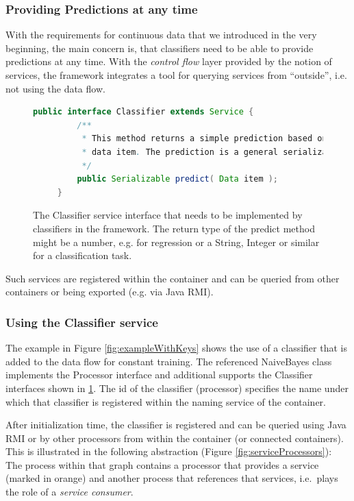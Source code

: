 \subsubsection*{Providing Predictions at any time}
With the requirements for continuous data that we introduced in the
very beginning, the main concern is, that classifiers need to be able
to provide predictions at any time. With the {\em control flow} layer
provided by the notion of services, the \streams framework integrates
a tool for querying services from ``outside'', i.e. not using the data
flow.
\begin{figure}[b]
  \centering
  \begin{lstlisting}[language=Java]
     public interface Classifier extends Service {
         /**
          * This method returns a simple prediction based on the given
          * data item. The prediction is a general serializable value.
          */
         public Serializable predict( Data item );
     }
  \end{lstlisting}
  \caption{\label{fig:classifierService}The {\ttfamily Classifier}
    service interface that needs to be implemented by classifiers in
    the \streams framework. The return type of the {\ttfamily predict}
    method might be a number, e.g. for regression or a String, Integer
    or similar for a classification task.}
\end{figure}
Such services are registered within the container and can be
queried from other containers or being exported (e.g. via Java RMI).


\subsubsection{\label{sec:addPrediction}Using the Classifier service}
The example in Figure \ref{fig:exampleWithKeys} shows the use of a
classifier that is added to the data flow for constant training. The
referenced {\ttfamily NaiveBayes} class implements the {\ttfamily
  Processor} interface and additional supports the {\ttfamily
  Classifier} interfaces shown in \ref{fig:classifierService}. The
{\ttfamily id} of the classifier (processor) specifies the name under
which that classifier is registered within the naming service of the
container.

After initialization time, the classifier is registered and can be
queried using Java RMI or by other processors from within the
container (or connected containers). This is illustrated in the
following abstraction (Figure \ref{fig:serviceProcessors}): The 
process within that graph contains a processor that provides a
service (marked in orange) and another process that references
that services, i.e.~plays the role of a {\em service consumer}.

